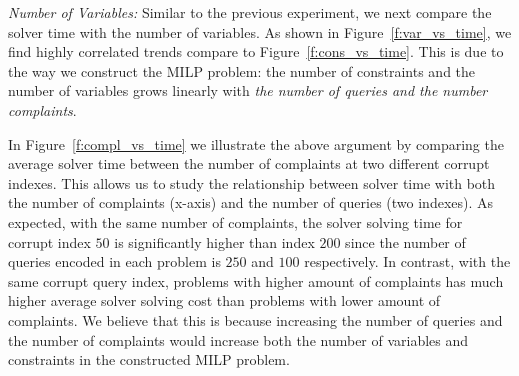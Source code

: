 \smallskip
\emph{Number of Variables: } Similar to the previous experiment, we next compare the solver time with the number of variables. As shown in Figure~\ref{f:var_vs_time}, we find highly correlated trends compare to Figure~\ref{f:cons_vs_time}. 
This is due to the way we construct the MILP problem: the number of constraints and the number of variables grows linearly with \textit{the number of queries and the number complaints}.  

In Figure~\ref{f:compl_vs_time} we illustrate the above argument by comparing the average solver time between the number of complaints at two different corrupt indexes. This allows us to study the relationship between solver time with both the number of complaints (x-axis) and the number of queries (two indexes). As expected, with the same number of complaints, the solver solving time for corrupt index $50$ is significantly higher than index $200$ since the number of queries encoded in each problem is $250$ and $100$ respectively. In contrast, with the same corrupt query index, problems with higher amount of complaints has much higher average solver solving cost than problems with lower amount of complaints. We believe that this is because increasing the number of queries and the number of complaints would increase both the number of variables and constraints in the constructed MILP problem. 


